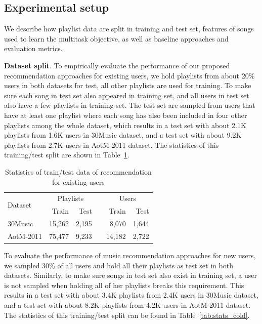 
\subsection{Experimental setup}
We describe how playlist data are split in training and test set,
features of songs used to learn the multitask objective, as well as
baseline approaches and evaluation metrics.

{\bf Dataset split}.
To empirically evaluate the performance of our proposed recommendation approaches for existing users,
we hold playlists from about 20\% users in both datasets for test,
all other playlists are used for training.
To make sure each song in test set also appeared in training set,
and all users in test set also have a few playlists in training set.
The test set are sampled from users that have at least one playlist where each song has also been
included in four other playlists among the whole dataset,
which results in a test set with about 2.1K playlists from 1.6K users in 30Music dataset,
and a test set with about 9.2K playlists from 2.7K users in AotM-2011 dataset.
The statistics of this training/test split are shown in Table~\ref{tab:stats_warm}.

\begin{table}[!h]
\centering
\caption{Statistics of train/test data of recommendation for existing users}
\label{tab:stats_warm}
\begin{tabular}{lrrcrr}
\toprule
\multirow{2}{*}{Dataset}  & \multicolumn{2}{c}{Playlists} && \multicolumn{2}{c}{Users} \\ \cmidrule{2-3} \cmidrule{5-6}
                          & Train & Test && Train & Test \\
\midrule
30Music   & 15,262 & 2,195 &&  8,070 & 1,644 \\
AotM-2011 & 75,477 & 9,233 && 14,182 & 2,722 \\
\bottomrule
\end{tabular}
\end{table}

To evaluate the performance of music recommendation approaches for new users,
we sampled 30\% of all users and hold all their playlists as test set in both datasets.
Similarly, to make sure songs in test set also exist in training set,
a user is not sampled when holding all of her playlists breaks this requirement.
This results in a test set with about 3.4K playlists from 2.4K users in 30Music dataset,
and a test set with about 8.2K playlists from 4.2K users in AotM-2011 dataset.
The statistics of this training/test split can be found in Table~\ref{tab:stats_cold}.

